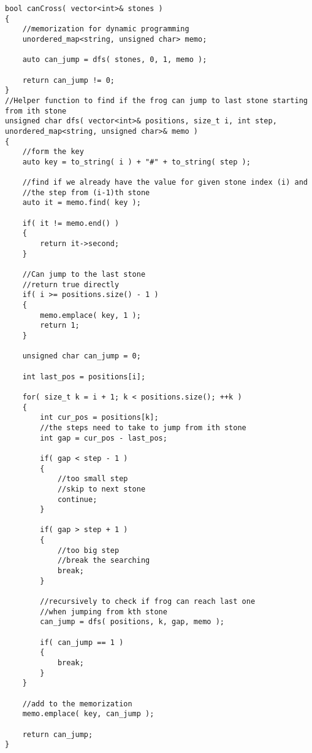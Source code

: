 \setcounter{lstlisting}{0}
\begin{lstlisting}[style=customc, caption={Dynamic Programming}]
bool canCross( vector<int>& stones )
{
    //memorization for dynamic programming
    unordered_map<string, unsigned char> memo;

    auto can_jump = dfs( stones, 0, 1, memo );

    return can_jump != 0;
}
//Helper function to find if the frog can jump to last stone starting from ith stone
unsigned char dfs( vector<int>& positions, size_t i, int step, unordered_map<string, unsigned char>& memo )
{
    //form the key
    auto key = to_string( i ) + "#" + to_string( step );

    //find if we already have the value for given stone index (i) and
    //the step from (i-1)th stone
    auto it = memo.find( key );

    if( it != memo.end() )
    {
        return it->second;
    }

    //Can jump to the last stone
    //return true directly
    if( i >= positions.size() - 1 )
    {
        memo.emplace( key, 1 );
        return 1;
    }

    unsigned char can_jump = 0;

    int last_pos = positions[i];

    for( size_t k = i + 1; k < positions.size(); ++k )
    {
        int cur_pos = positions[k];
        //the steps need to take to jump from ith stone
        int gap = cur_pos - last_pos;

        if( gap < step - 1 )
        {
            //too small step
            //skip to next stone
            continue;
        }

        if( gap > step + 1 )
        {
            //too big step
            //break the searching
            break;
        }

        //recursively to check if frog can reach last one
        //when jumping from kth stone
        can_jump = dfs( positions, k, gap, memo );

        if( can_jump == 1 )
        {
            break;
        }
    }

    //add to the memorization
    memo.emplace( key, can_jump );

    return can_jump;
}

\end{lstlisting}